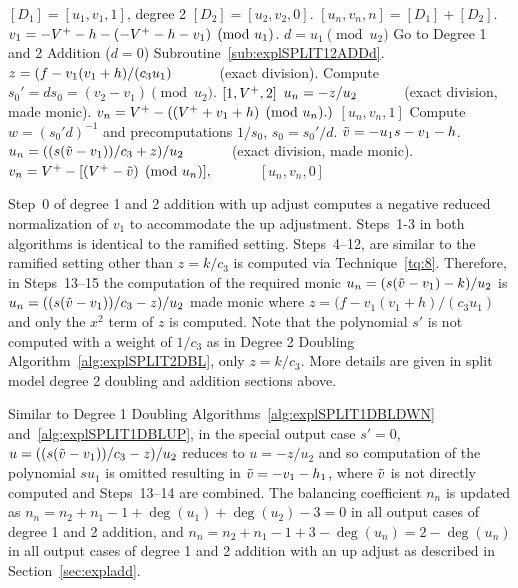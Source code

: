 \begin{algorithm}[htbp]
\caption{Genus 2 Split Model Degree 1 and 2 Addition with Up Adjust\label{alg:explSPLIT12ADDUP}}
\begin{algorithmic} [1]
\Require $[D_1] = [u_1,v_1,1]$, degree 2 $[D_2] = [u_2,v_2,0]$.\smallskip
\Ensure $[u_n,v_n,n] = [D_1] + [D_2] $.
\algrule
\setcounter{ALG@line}{-1}
\State $v_1 = -V^{+} - h - (-V^{+} - h - v_1) \pmod{u_1}$.
\State $d = u_1 \pmod{u_2}$
    \State Go to Degree 1 and 2 Addition ($d = 0$) Subroutine~\ref{sub:explSPLIT12ADDd}.
\EndIf
\State $z = (f - v_1(v_1 + h)/(c_3u_1) \quad\quad\quad$ (exact division).
\State Compute $s_0' = ds_0 = (v_2 - v_1) \pmod{u_2}$.
     \Return $[1,V^{+},2]$
    \EndIf
\Else 
    \State $u_n = -z/u_2 \quad\quad\quad$ (exact division, made monic).
    \State $v_n = V^{+} - ((V^{+} + v_1 + h)  \pmod{u_n}.)$
    \State \Return $[u_n,v_n,1]$
\EndIf
\State Compute $w = (s_0'd)^{-1}$ and precomputations $1/s_0$, $s_0 = s_0'/d$.
\State $\tilde{v} = -u_1s - v_1 - h$.
\State $u_n = ((s(\tilde{v} - v_1))/c_3 + z)/u_2 \quad\quad\quad$ (exact division, made monic).
\State $v_n = V^{+} - [(V^{+} - \tilde{v}) \pmod{u_n}], \quad\quad\quad$
\State \Return $[u_n,v_n,0]$
\end{algorithmic}
\end{algorithm}


 
Step~0 of degree 1 and 2 addition with up adjust computes a negative reduced
normalization of $v_1$ to accommodate the up adjustment. Steps~1-3 in both
algorithms is identical to the ramified setting. Steps~4--12, are similar to the
ramified setting other than $z = k/c_3$ is computed via Technique~\ref{tq:8}.
Therefore, in Steps~13--15 the computation of the required monic $u_n = (s(\tilde{v} -
v_1) - k)/u_2$ is $u_n = ((s(\tilde{v} - v_1))/c_3 - z)/u_2$ made monic where $z = (f
- v_1(v_1 + h)/(c_3u_1)$ and only the $x^2$ term of $z$ is computed. Note that
the polynomial $s'$ is not computed with a weight of $1/c_3$ as in Degree 2
Doubling Algorithm~\ref{alg:explSPLIT2DBL}, only $z = k/c_3$. More details are
given in split model degree 2 doubling and addition sections above.

Similar to Degree 1 Doubling Algorithms~\ref{alg:explSPLIT1DBLDWN}
and~\ref{alg:explSPLIT1DBLUP}, in the special output case $s' = 0$, $u = ((s(\tilde{v}
- v_1))/c_3 - z)/u_2$ reduces to $u = -z/u_2$ and so computation of the
polynomial $su_1$ is omitted resulting in $\tilde{v} = -v_1 - h_1$, where $\tilde{v}$ is not
directly computed and Steps~13--14 are combined. The balancing coefficient $n_n$
is updated as $n_n = n_2 + n_1 - 1 + \deg(u_1) + \deg(u_2) - 3 = 0$ in all
output cases of degree 1 and 2 addition, and $n_n = n_2 + n_1 - 1 + 3 -
\deg(u_n) = 2 - \deg(u_n)$ in all output cases of degree 1 and 2 addition with
an up adjust as described in Section~\ref{sec:expladd}.

